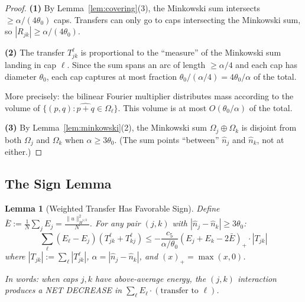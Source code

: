 \documentclass[11pt]{article}
\newtheorem{lemma}[theorem]{Lemma}
\theoremstyle{definition}
\begin{document}
\begin{proof}
\textbf{(1)} By Lemma~\ref{lem:covering}(3), the Minkowski sum intersects $\geq \alpha/(4\theta_0)$ caps. Transfers can only go to caps intersecting the Minkowski sum, so $|R_{jk}| \geq \alpha/(4\theta_0)$.

\textbf{(2)} The transfer $T_{jk}^\ell$ is proportional to the ``measure'' of the Minkowski sum landing in cap $\ell$. Since the sum spans an arc of length $\geq \alpha/4$ and each cap has diameter $\theta_0$, each cap captures at most fraction $\theta_0/(\alpha/4) = 4\theta_0/\alpha$ of the total.

More precisely: the bilinear Fourier multiplier distributes mass according to the volume of $\{(p, q) : \widehat{p+q} \in \Omega_\ell\}$. This volume is at most $O(\theta_0/\alpha)$ of the total.

\textbf{(3)} By Lemma~\ref{lem:minkowski}(2), the Minkowski sum $\Omega_j \oplus \Omega_k$ is disjoint from both $\Omega_j$ and $\Omega_k$ when $\alpha \geq 3\theta_0$. (The sum points ``between'' $\hat{n}_j$ and $\hat{n}_k$, not at either.)
\end{proof}

\subsection{The Sign Lemma}

\begin{lemma}[Weighted Transfer Has Favorable Sign]\label{lem:sign}
Define $\bar{E} := \frac{1}{N}\sum_j E_j = \frac{\|u\|_{\dot{H}^{1/2}}^2}{N}$. For any pair $(j, k)$ with $|\hat{n}_j - \hat{n}_k| \geq 3\theta_0$:
\begin{equation}\label{eq:sign-ineq}
\sum_{\ell} (E_\ell - E_j)(T_{jk}^\ell + T_{kj}^\ell) \leq -\frac{c_5}{\alpha/\theta_0} (E_j + E_k - 2\bar{E})_+ \cdot |T_{jk}| 
\end{equation}
where $|T_{jk}| := \sum_\ell |T_{jk}^\ell|$, $\alpha = |\hat{n}_j - \hat{n}_k|$, and $(x)_+ = \max(x, 0)$.

In words: when caps $j, k$ have above-average energy, the $(j,k)$ interaction produces a NET DECREASE in $\sum_\ell E_\ell \cdot (\text{transfer to } \ell)$.
\end{lemma}
\end{document}
